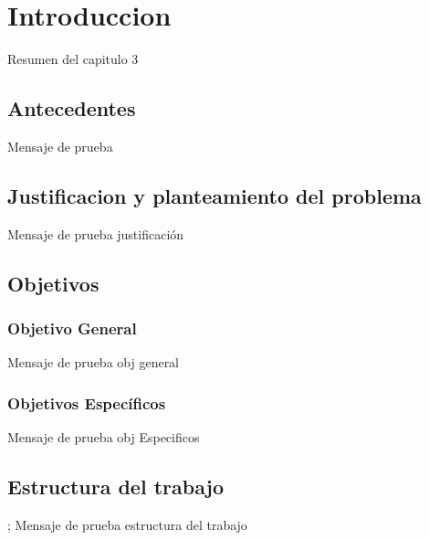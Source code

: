 \chapter{Introduccion}
\label{capitulo1}

Resumen del capitulo 3

\section{Antecedentes}
Mensaje de prueba
\section{Justificacion y planteamiento del problema}
Mensaje de prueba justificación
\section{Objetivos}
\subsection{Objetivo General}
Mensaje de prueba obj general
\subsection{Objetivos Específicos}
Mensaje de prueba obj Especificos
\section{Estructura del trabajo};
Mensaje de prueba estructura del trabajo
